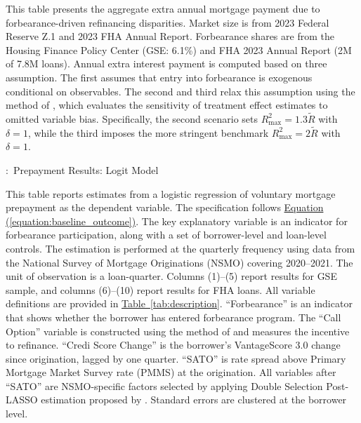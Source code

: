 \documentclass[11pt]{article}
\begin{document}
{\begin{table}[htbp]
\begin{minipage}{\textwidth}
\small
This table presents the aggregate extra annual mortgage payment due to forbearance-driven refinancing disparities. Market size is from 2023 Federal Reserve Z.1 and 2023 FHA Annual Report. Forbearance shares are from the Housing Finance Policy Center (GSE: 6.1\%) and FHA 2023 Annual Report (2M of 7.8M loans). Annual extra interest payment is computed based on three assumption. The first assumes that entry into forbearance is exogenous conditional on observables. The second and third relax this assumption using the method of \citet{oster2019}, which evaluates the sensitivity of treatment effect estimates to omitted variable bias. Specifically, the second scenario sets $R^2_{\text{max}} = 1.3\tilde{R}$ with $\delta=1$, while the third imposes the more stringent benchmark $R^2_{\text{max}} = 2\tilde{R}$ with $\delta=1$.
\end{minipage}

\vspace{1em}
\centering



\end{table}
\FloatBarrier
\clearpage





\begin{table}[htbp]
\captionsetup{justification=justified,singlelinecheck=false}
\footnotesize
\caption{:\ Prepayment Results: Logit Model}
\label{tab:logit_prepayment}

\vspace{0.5em}

\begin{minipage}{\textwidth}
\small
This table reports estimates from a logistic regression of voluntary mortgage prepayment as the dependent variable. The specification follows \hyperref[equation:baseline_outcome]{Equation (\ref*{equation:baseline_outcome})}. The key explanatory variable is an indicator for forbearance participation, along with a set of borrower-level and loan-level controls. The estimation is performed at the quarterly frequency using data from the National Survey of Mortgage Originations (NSMO) covering 2020–2021. The unit of observation is a loan-quarter. Columns (1)–(5) report results for GSE sample, and columns (6)–(10) report results for FHA loans. All variable definitions are provided in \hyperref[tab:description]{Table~\ref*{tab:description}}. ``Forbearance'' is an indicator that shows whether the borrower has entered forbearance program. The ``Call Option'' variable is constructed using the method of \citet{deng2000mortgage} and measures the incentive to refinance. ``Credi Score Change'' is the borrower’s VantageScore 3.0 change since origination, lagged by one quarter. ``SATO'' is rate spread above Primary Mortgage Market Survey rate (PMMS) at the origination. All variables after ``SATO'' are NSMO-specific factors selected by applying Double Selection Post-LASSO estimation proposed by \citet{belloni2014inference}.  Standard errors are clustered at the borrower level. 
\end{minipage}


\end{table}}
\end{document}

